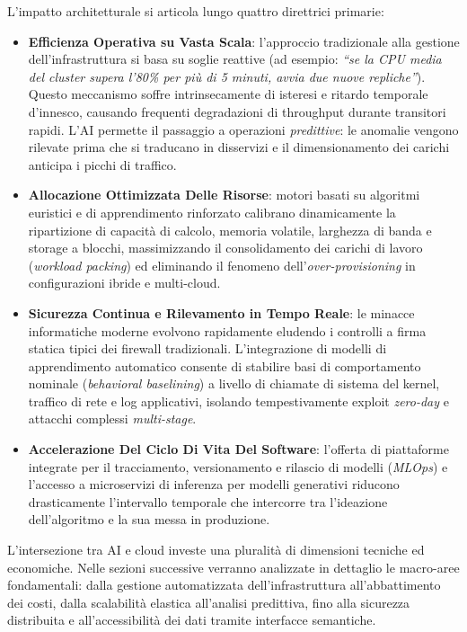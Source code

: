 \documentclass[11pt, a4paper]{article}
\begin{document}
L'impatto architetturale si articola lungo quattro direttrici primarie:
\begin{itemize}
    \item \textbf{Efficienza Operativa su Vasta Scala}: l'approccio tradizionale alla gestione dell'infrastruttura si basa su soglie reattive (ad esempio: \emph{``se la CPU media del cluster supera l'80\% per più di 5 minuti, avvia due nuove repliche''}). Questo meccanismo soffre intrinsecamente di isteresi e ritardo temporale d'innesco, causando frequenti degradazioni di throughput durante transitori rapidi. L'AI permette il passaggio a operazioni \emph{predittive}: le anomalie vengono rilevate prima che si traducano in disservizi e il dimensionamento dei carichi anticipa i picchi di traffico.
    \item \textbf{Allocazione Ottimizzata Delle Risorse}: motori basati su algoritmi euristici e di apprendimento rinforzato calibrano dinamicamente la ripartizione di capacità di calcolo, memoria volatile, larghezza di banda e storage a blocchi, massimizzando il consolidamento dei carichi di lavoro (\emph{workload packing}) ed eliminando il fenomeno dell'\emph{over-provisioning} in configurazioni ibride e multi-cloud.
    \item \textbf{Sicurezza Continua e Rilevamento in Tempo Reale}: le minacce informatiche moderne evolvono rapidamente eludendo i controlli a firma statica tipici dei firewall tradizionali. L'integrazione di modelli di apprendimento automatico consente di stabilire basi di comportamento nominale (\emph{behavioral baselining}) a livello di chiamate di sistema del kernel, traffico di rete e log applicativi, isolando tempestivamente exploit \emph{zero-day} e attacchi complessi \emph{multi-stage}.
    \item \textbf{Accelerazione Del Ciclo Di Vita Del Software}: l'offerta di piattaforme integrate per il tracciamento, versionamento e rilascio di modelli (\emph{MLOps}) e l'accesso a microservizi di inferenza per modelli generativi riducono drasticamente l'intervallo temporale che intercorre tra l'ideazione dell'algoritmo e la sua messa in produzione.
\end{itemize}


L'intersezione tra AI e cloud investe una pluralità di dimensioni tecniche ed economiche. Nelle sezioni successive verranno analizzate in dettaglio le macro-aree fondamentali: dalla gestione automatizzata dell'infrastruttura all'abbattimento dei costi, dalla scalabilità elastica all'analisi predittiva, fino alla sicurezza distribuita e all'accessibilità dei dati tramite interfacce semantiche.
\end{document}

